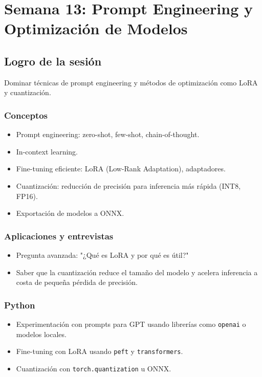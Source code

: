 \documentclass[12pt,a4paper,openany,oneside]{book}
\begin{document}
\chapter{Semana 13: Prompt Engineering y Optimización de Modelos}

\section{Logro de la sesión}
Dominar técnicas de prompt engineering y métodos de optimización como LoRA y cuantización.

\subsection{Conceptos}
\begin{itemize}
    \item Prompt engineering: zero-shot, few-shot, chain-of-thought.
    \item In-context learning.
    \item Fine-tuning eficiente: LoRA (Low-Rank Adaptation), adaptadores.
    \item Cuantización: reducción de precisión para inferencia más rápida (INT8, FP16).
    \item Exportación de modelos a ONNX.
\end{itemize}

\subsection{Aplicaciones y entrevistas}
\begin{itemize}
    \item Pregunta avanzada: "¿Qué es LoRA y por qué es útil?"
    \item Saber que la cuantización reduce el tamaño del modelo y acelera inferencia a costa de pequeña pérdida de precisión.
\end{itemize}

\subsection{Python}
\begin{itemize}
    \item Experimentación con prompts para GPT usando librerías como \texttt{openai} o modelos locales.
    \item Fine-tuning con LoRA usando \texttt{peft} y \texttt{transformers}.
    \item Cuantización con \texttt{torch.quantization} u ONNX.
\end{itemize}
\end{document}
